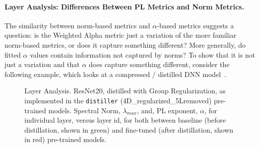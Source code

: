 \paragraph{Layer Analysis: Differences Between PL Metrics and Norm Metrics.}

The similarity between norm-based metrics and $\alpha$-based metrics suggests a question: is the Weighted Alpha metric just a variation of the more familiar norm-based metrics, or does it capture something different?  
More generally, do fitted $\alpha$ values contain information not captured by norms? 
To show that it is not just a variation and that $\alpha$ does capture something different, consider the following example, which looks at a compressed / distilled DNN model~\cite{CWZZ17_TR}.


\begin{figure}[t]
   \centering
   \caption{Layer Analysis.
            ResNet20, distilled with Group Regularization, as implemented in the \texttt{distiller} (4D\_regularized\_5Lremoved) pre-trained models.  
            Spectral Norm, $\lambda_{max}$, and, PL exponent, $\alpha$, for individual layer, versus layer id, for both between baseline (before distillation, shown in green) and fine-tuned (after distillation, shown in red) pre-trained models. 
           }
   \label{fig:resnet204D5L}
\end{figure}

